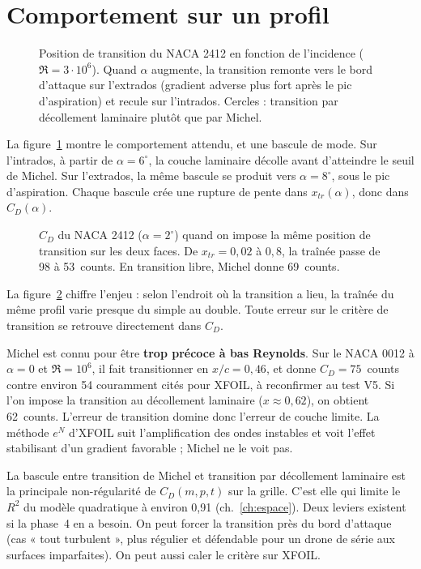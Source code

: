 \section{Comportement sur un profil}
\begin{figure}[htbp]
\centering

\caption{Position de transition du NACA 2412 en fonction de l'incidence ($\Re=3\cdot10^6$). Quand $\alpha$ augmente, la transition remonte vers le bord d'attaque sur l'extrados (gradient adverse plus fort après le pic d'aspiration) et recule sur l'intrados. Cercles : transition par décollement laminaire plutôt que par Michel.}\label{fig:xtr-alpha}
\end{figure}

La figure~\ref{fig:xtr-alpha} montre le comportement attendu, et une bascule de mode. Sur l'intrados, à partir de $\alpha=6^\circ$, la couche laminaire décolle avant d'atteindre le seuil de Michel. Sur l'extrados, la même bascule se produit vers $\alpha=8^\circ$, sous le pic d'aspiration. Chaque bascule crée une rupture de pente dans $x_{tr}(\alpha)$, donc dans $C_D(\alpha)$.

\begin{figure}[htbp]
\centering

\caption{$C_D$ du NACA 2412 ($\alpha=2^\circ$) quand on impose la même position de transition sur les deux faces. De $x_{tr}=0{,}02$ à $0{,}8$, la traînée passe de 98 à 53~counts. En transition libre, Michel donne 69~counts.}\label{fig:cd-xtrip}
\end{figure}

La figure~\ref{fig:cd-xtrip} chiffre l'enjeu : selon l'endroit où la transition a lieu, la traînée du même profil varie presque du simple au double. Toute erreur sur le critère de transition se retrouve directement dans $C_D$.

\begin{piege}
Michel est connu pour être \textbf{trop précoce à bas Reynolds}. Sur le NACA 0012 à $\alpha=0$ et $\Re=10^6$, il fait transitionner en $x/c=0{,}46$, et donne $C_D=75$~counts contre environ 54 couramment cités pour XFOIL, à reconfirmer au test V5. Si l'on impose la transition au décollement laminaire ($x\approx0{,}62$), on obtient 62~counts. L'erreur de transition domine donc l'erreur de couche limite. La méthode $e^N$ d'XFOIL suit l'amplification des ondes instables et voit l'effet stabilisant d'un gradient favorable ; Michel ne le voit pas.
\end{piege}

\begin{projet}
La bascule entre transition de Michel et transition par décollement laminaire est la principale non-régularité de $C_D(m,p,t)$ sur la grille. C'est elle qui limite le $R^2$ du modèle quadratique à environ 0,91 (ch.~\ref{ch:espace}). Deux leviers existent si la phase~4 en a besoin. On peut forcer la transition près du bord d'attaque (cas « tout turbulent », plus régulier et défendable pour un drone de série aux surfaces imparfaites). On peut aussi caler le critère sur XFOIL.
\end{projet}

